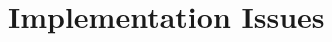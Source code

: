 \section{Implementation Issues}
\label{sect:algorithms}

\begin{comment}

In this section, we detail the challenges and advantages of the aforementioned
MPI constructs. They unfold along three main axes, the amount of supplementary
state and memory to be kept within the MPI library, the additional operations to
be executed on the critical path of communication routines, and the algorithmic
cost of failure recovery routines. We discuss, in general, options available to
implementors, and highlight issues with insight from a prototype implementation
in Open~MPI~\cite{gabriel04:_open_mpi}.

\subsection{Impact on communication routines}

\paragraph*{Memory:} Because a communicator cannot be repaired,
tracking the state of failed processes imposes a minimal memory overhead.  From
a practical perspective each node needs a global list of detected failures,
shared by all communicators; its size grows linearly with the number of
failures, and it is empty as long as no failures occur.  Within each
communicator, the supplementary state is limited to two values: whether the
communicator is revoked or not, and an index in the global list of failures
denoting the last acknowledged failure (with
\mpifunc{MPI\_COMM\_FAILURE\_ACK}). For efficiency reasons, an implementation
may decide to cache the fact that some failures have happened in the
communicator so that collective operations and \mpifunc{MPI\_ANY\_SOURCE}
receptions can bail out quickly. Overall, the supplementary memory consumption
from fault tolerant constructs is small, independent of the total number of
nodes, and unlikely to affect the cache and TLB hit rates.

\paragraph*{Conditionals:} Another concern is the number of supplementary
conditions on the latency critical path. Indeed, most completion operations
require a supplementary conditional statement to handle the case where the
underlying communication context has been revoked. However, the prediction
branching logic of the processor can be hinted to favor the failure free
outcome, resulting in a single load of a cached value and a single, mostly
well-predicted, branching instruction, unlikely to affect the instruction
pipeline. It is notable that non-blocking operations raise errors related to
process failure only during the completion step, and thus do not need to check
for revocation before the latency critical section.


\end{comment}
